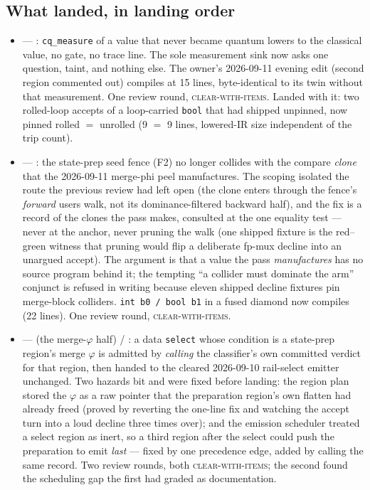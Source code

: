 \subsection*{What landed, in landing order}
\begin{itemize}
  \item {} --- : \texttt{cq\_measure} of a value that never became quantum lowers to
    the classical value, no gate, no trace line. The sole measurement sink now asks one question, taint,
    and nothing else. The owner's 2026-09-11 evening edit (second region commented out) compiles at 15
    lines, byte-identical to its twin without that measurement. One review round, \textsc{clear-with-items}.
    Landed with it: two rolled-loop accepts of a loop-carried \texttt{bool} that had shipped unpinned, now
    pinned rolled \(=\) unrolled (9 \(=\) 9 lines, lowered-IR size independent of the trip count).
  \item {} --- : the state-prep seed fence (F2) no longer collides with the compare
    \emph{clone} that the 2026-09-11 merge-phi peel manufactures. The scoping isolated the route the
    previous review had left open (the clone enters through the fence's \emph{forward} users walk, not its
    dominance-filtered backward half), and the fix is a record of the clones the pass makes, consulted at
    the one equality test --- never at the anchor, never pruning the walk (one shipped fixture is the
    red--green witness that pruning would flip a deliberate fp-mux decline into an unargued accept). The
    argument is that a value the pass \emph{manufactures} has no source program behind it; the tempting
    ``a collider must dominate the arm'' conjunct is refused in writing because eleven shipped decline
    fixtures pin merge-block colliders. \texttt{int b0 / bool b1} in a fused diamond now compiles (22 lines).
    One review round, \textsc{clear-with-items}.
  \item {} ---  (the merge-\(\varphi\) half) / : a data \texttt{select} whose
    condition is a state-prep region's merge \(\varphi\) is admitted by \emph{calling} the classifier's own
    committed verdict for that region, then handed to the cleared 2026-09-10 rail-select emitter unchanged.
    Two hazards bit and were fixed before landing: the region plan stored the \(\varphi\) as a raw pointer
    that the preparation region's own flatten had already freed (proved by reverting the one-line fix and
    watching the accept turn into a loud decline three times over); and the emission scheduler treated a
    select region as inert, so a third region after the select could push the preparation to emit
    \emph{last} --- fixed by one precedence edge, added by calling the same record. Two review rounds,
    both \textsc{clear-with-items}; the second found the scheduling gap the first had graded as
    documentation.
\end{itemize}

